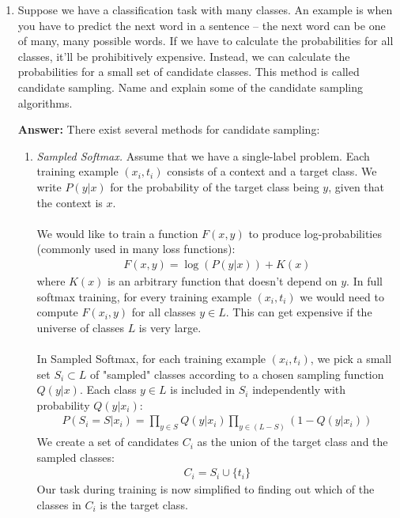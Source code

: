 \documentclass{article}
\newenvironment{QandA}{\begin{enumerate}[label=\arabic*.]}{\end{enumerate}}
\newenvironment{ListAlph}{\begin{enumerate}[label=(\alph*)]}{\end{enumerate}}
\newenvironment{answer}{\par\normalfont \textbf{Answer:}}{}
\newcommand{\g}{\vert}
\begin{document}
\begin{QandA}
    \item Suppose we have a classification task with many classes. An example is when you have to predict the next word in a sentence -- the next word can be one of many, many possible words. If we have to calculate the probabilities for all classes, it’ll be prohibitively expensive. Instead, we can calculate the probabilities for a small set of candidate classes. This method is called candidate sampling. Name and explain some of the candidate sampling algorithms.
    \begin{answer}
        There exist several methods for candidate sampling:
        \begin{ListAlph}
            \item \textit{Sampled Softmax.} Assume that we have a single-label problem. Each training example $(x_i, t_i)$ consists of a context and a target class. We write $P(y \g x)$ for the probability of the target class being $y$, given that the context is $x$. \\\\
            We would like to train a function $F(x, y)$ to produce log-probabilities (commonly used in many loss functions):
            \begin{align*}
                F(x, y) = \log (P(y \g x)) + K(x)
            \end{align*}
            where $K(x)$ is an arbitrary function that doesn't depend on $y$. In full softmax training, for every training example $(x_i, t_i)$ we would need to compute $F(x_i, y)$ for all classes $y \in L$. This can get expensive if the universe of classes $L$ is very large. \\\\
            In Sampled Softmax, for each training example $(x_i, t_i)$, we pick a small set $S_i \subset L$ of "sampled" classes according to a chosen sampling function $Q(y \g x)$. Each class $y \in L$ is included in $S_i$ independently with probability $Q(y \g x_i)$:
            \begin{align*}
                P(S_i = S \g x_i) = \prod_{y \in S} Q(y \g x_i) \prod_{y \in (L - S)} (1 - Q(y \g x_i))
            \end{align*}
            We create a set of candidates $C_i$ as the union of the target class and the sampled classes:
            \begin{align*}
                C_i = S_i \cup \{ t_i \}
            \end{align*}
            Our task during training is now simplified to finding out which of the classes in $C_i$ is the target class.\\\\

\end{ListAlph}
\end{answer}
\end{QandA}
\end{document}

